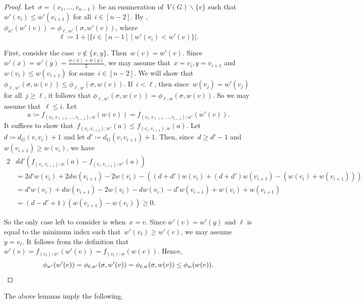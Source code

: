 \documentclass[reqno, 12pt]{amsart}
\numberwithin{equation}{section}
\numberwithin{figure}{section}
\theoremstyle{plain}
\theoremstyle{definition}
\let\setminus=\smallsetminus
\newcommand*{\abs}[1]{\ensuremath{{\left\lvert {#1} \right\rvert}}}
\begin{document}
\begin{proof}
    Let~${\sigma=(v_1, \ldots, v_{n-1})}$ be an enumeration of~${V(G) \setminus \{v\}}$ such that~${w'(v_i) \leq w'(v_{i+1})}$ for all~${i \in [n-2]}$. 
    By , ${\phi_{w'}(w'(v)) = \phi_{\ell, w'}(\sigma, w'(v))}$, where
    \[
        \ell \coloneq 1 + \abs{\{ i \in [n-1] \mid w'(v_i) < w'(v) \}}.
    \]
    

    First, consider the case~${v \notin \{x,y\}}$. 
    Then~${w(v) = w'(v)}$. 
    Since~${w'(x) = w'(y) = \frac{w(x)+w(y)}{2}}$, we may assume that~${x = v_i, y = v_{i+1}}$ and~${w(v_i) \leq w(v_{i+1})}$ for some~${i \in [n-2]}$. 
    We will show that~${\phi_{\ell, w'}(\sigma, w(v)) \leq \phi_{\ell, w}(\sigma, w(v))}$. 
    If~${i < \ell}$, then since~${w(v_j) = w'(v_j)}$ for all~${j \geq \ell}$, it follows that ${\phi_{\ell, w'}(\sigma, w(v)) = \phi_{\ell, w}(\sigma, w(v))}$. 
    So we may assume that~${\ell \leq i}$. 
    Let 
    \[
        a \coloneqq f_{(v_{\ell}, v_{\ell+1}, \ldots, v_{i-1}); w}(w(v)) = f_{(v_{\ell}, v_{\ell+1}, \ldots, v_{i-1}); w'}(w'(v)). 
    \]
    It suffices to show that~${f_{(v_i, v_{i+1}); w'}(a) \leq f_{(v_i, v_{i+1}); w}(a)}$. 
    Let~${d \coloneqq d_G(v, v_{i})+1}$ and let \linebreak ${d' \coloneqq d_G(v, v_{i+1})+1}$. 
    Then, since~${d \geq d'-1}$ and~${w(v_{i+1}) \geq w(v_i)}$, we have 
     \begin{align*}
        2&dd'(f_{(v_i, v_{i+1}); w}(a)-  f_{(v_i, v_{i+1}); w'}(a))\\
        &= 2d'w(v_i) + 2dw(v_{i+1}) -2w(v_i) - ((d+d')w(v_i) + (d+d')w(v_{i+1}) - (w(v_i)+w(v_{i+1}))) \\
        &= d'w(v_i)+dw(v_{i+1})-2w(v_i) - dw(v_i)-d'w(v_{i+1}) + w(v_i)+w(v_{i+1}) \\
        &= (d-d'+1)(w(v_{i+1})-w(v_i)) 
        \geq 0.
    \end{align*}
    
    So the only case left to consider is when~${x=v}$. 
    Since $w'(v) = w'(y)$ and $\ell$ is equal to the minimum index such that~${w'(v_\ell) \geq w'(v)}$, we   may assume~${y = v_{\ell}}$. 
    It follows from the definition that ${w'(v) = f_{(v_{\ell}); w'}(w'(v)) = f_{(v_{\ell}); w}(w(v)) }$. 
    Hence, 
    \[
        \phi_{w'}(w'(v)) 
        = \phi_{\ell, w'}(\sigma, w'(v)) 
        = \phi_{\ell, w}(\sigma, w(v)) 
        \leq \phi_w(w(v)). \qedhere
    \]
\end{proof}

The above lemmas imply the following.  
\end{document}
